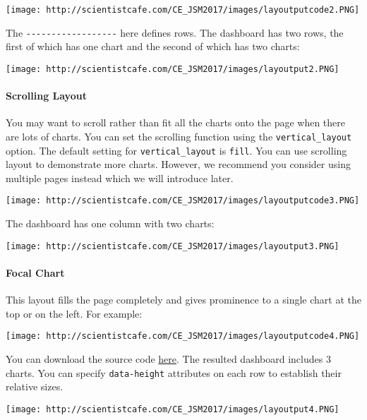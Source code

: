\documentclass[
]{article}
\begin{document}
\texttt{[image: http://scientistcafe.com/CE\_JSM2017/images/layoutputcode2.PNG]}

The \texttt{-\/-\/-\/-\/-\/-\/-\/-\/-\/-\/-\/-\/-\/-\/-\/-\/-\/-} here
defines rows. The dashboard has two rows, the first of which has one
chart and the second of which has two charts:

\texttt{[image: http://scientistcafe.com/CE\_JSM2017/images/layoutput2.PNG]}

\hypertarget{scrolling-layout}{%
\paragraph{Scrolling Layout}\label{scrolling-layout}}

You may want to scroll rather than fit all the charts onto the page when
there are lots of charts. You can set the scrolling function using the
\texttt{vertical\_layout} option. The default setting for
\texttt{vertical\_layout} is \texttt{fill}. You can use scrolling layout
to demonstrate more charts. However, we recommend you consider using
multiple pages instead which we will introduce later.

\texttt{[image: http://scientistcafe.com/CE\_JSM2017/images/layoutputcode3.PNG]}

The dashboard has one column with two charts:

\texttt{[image: http://scientistcafe.com/CE\_JSM2017/images/layoutput3.PNG]}

\hypertarget{focal-chart}{%
\paragraph{Focal Chart}\label{focal-chart}}

This layout fills the page completely and gives prominence to a single
chart at the top or on the left. For example:

\texttt{[image: http://scientistcafe.com/CE\_JSM2017/images/layoutputcode4.PNG]}

You can download the source code
\href{https://raw.githubusercontent.com/happyrabbit/linhui.org/gh-pages/CE_JSM2017/Examples/FocalChartTop.Rmd}{here}.
The resulted dashboard includes 3 charts. You can specify
\texttt{data-height} attributes on each row to establish their relative
sizes.

\texttt{[image: http://scientistcafe.com/CE\_JSM2017/images/layoutput4.PNG]}
\end{document}
